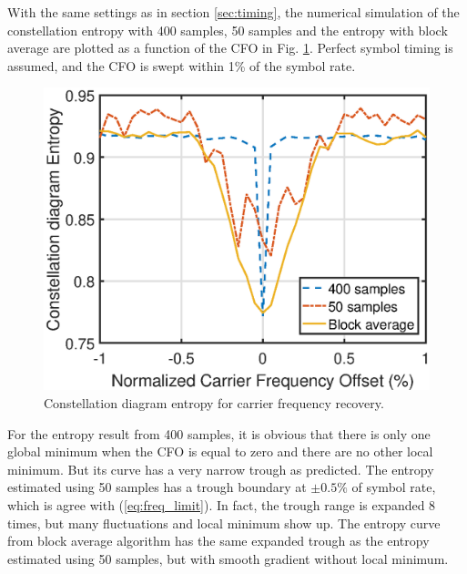 \documentclass[journal,comsoc]{IEEEtran}
\begin{document}
With the same settings as in section \ref{sec:timing}, the numerical simulation of the constellation entropy with 400 samples, 50 samples and the entropy with block average are plotted as a function of the CFO in Fig. \ref{fig:freq_entp}.
Perfect symbol timing is assumed, and the CFO is swept within 1\% of the symbol rate.



\begin{figure}[ht]
\centering
\includegraphics[width=3 in]{pic/freq.eps}
\caption{Constellation diagram entropy for carrier frequency recovery.}
\label{fig:freq_entp} 
\end{figure}   

For the entropy result from 400 samples, it is obvious that there is only one global minimum when the CFO is equal to zero and there are no other local minimum.
But its curve has a very narrow trough as predicted.
The entropy estimated using 50 samples has a trough boundary at \(\pm 0.5\%\) of symbol rate, which is agree with (\ref{eq:freq_limit}).
In fact, the trough range is expanded 8 times, but many fluctuations and local minimum show up.
The entropy curve from block average algorithm has the same expanded trough as the entropy estimated using 50 samples, but with smooth gradient without local minimum.
\end{document}
